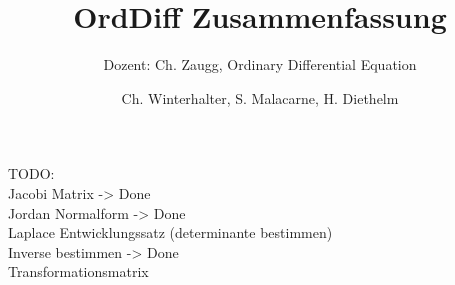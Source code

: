 \documentclass{scrartcl}
\title{OrdDiff Zusammenfassung}
\subtitle{Dozent: Ch. Zaugg, Ordinary Differential Equation}
\author{Ch. Winterhalter, S. Malacarne, H. Diethelm}
\begin{document}

\lstset{language=Matlab}

\maketitle
\newpage

\tableofcontents
\newpage


\setcounter{section}{0}

TODO: \\
Jacobi Matrix -> Done\\
Jordan Normalform -> Done\\
Laplace Entwicklungssatz (determinante bestimmen)\\
Inverse bestimmen -> Done \\
Transformationsmatrix






\end{document}
